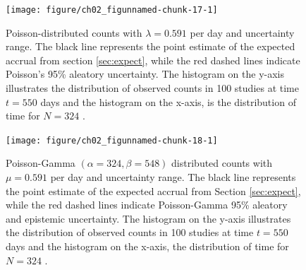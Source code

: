 \begin{figure}
\begin{knitrout}
\color{fgcolor}

{\centering \texttt{[image: figure/ch02\_figunnamed-chunk-17-1]} 

}


\end{knitrout}
  \caption{Poisson-distributed counts with $\lambda = 0.591$ per day and uncertainty range. The black line represents the point estimate of the expected accrual from section \ref{sec:expect}, while the red dashed lines indicate Poisson's 95\% aleatory uncertainty. The histogram on the y-axis illustrates the distribution of observed counts in 100 studies at time $t = 550$ days and the histogram on the x-axis, is the distribution of time for $N=324$ \citep{spiegelhalter2011visualizing, pkgacc}.}
  \label{fig:2_13}
\end{figure}


\begin{figure}
\begin{knitrout}
\color{fgcolor}

{\centering \texttt{[image: figure/ch02\_figunnamed-chunk-18-1]} 

}


\end{knitrout}
  \caption{Poisson-Gamma $(\alpha = 324, \beta = 548)$ distributed counts with $\mu = 0.591$ per day and uncertainty range. The black line represents the point estimate of the expected accrual from Section \ref{sec:expect}, while the red dashed lines indicate Poisson-Gamma 95\% aleatory and epistemic uncertainty. The histogram on the y-axis illustrates the distribution of observed counts in 100 studies at time $t = 550$ days and the histogram on the x-axis, the distribution of time for $N=324$ \citep{spiegelhalter2011visualizing, pkgacc}.}
  \label{fig:2_7}
\end{figure}
